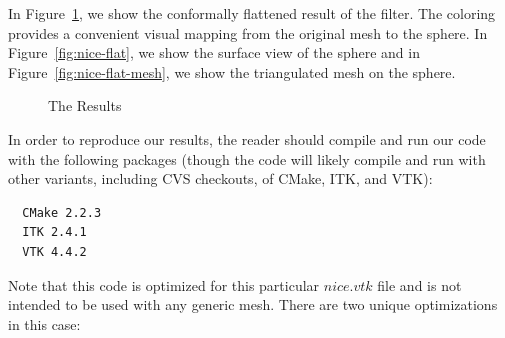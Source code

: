 \documentclass{InsightArticle}
\begin{document}
  In Figure~\ref{fig:results}, we show the conformally flattened
  result of the filter. The coloring provides a convenient visual
  mapping from the original mesh to the sphere. In
  Figure~\ref{fig:nice-flat}, we show the surface view of the sphere
  and in Figure~\ref{fig:nice-flat-mesh}, we show the triangulated
  mesh on the sphere.

  \begin{figure}[h]
		\begin{center}
    \end{center}
    \vspace{-.25in} \caption{The Results} \label{fig:results}
  \end{figure}  

  In order to reproduce our results, the reader should compile and run
  our code with the following packages (though the code will likely
  compile and run with other variants, including CVS checkouts, of
  CMake, ITK, and VTK):

  \begin{verbatim}
  CMake 2.2.3
  ITK 2.4.1
  VTK 4.4.2
  \end{verbatim}

  \noindent Note that this code is optimized for this particular
  $nice.vtk$ file and is not intended to be used with any generic
  mesh. There are two unique optimizations in this case:
\end{document}
